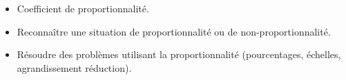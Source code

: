 \begin{prerequis}    
    \begin{itemize}        
        \item[\emoji{red-heart}] Coefficient de proportionnalité.
        \item[\emoji{diamond-suit}] Reconnaître une situation de proportionnalité ou de non-proportionnalité.
        \item[\emoji{diamond-suit}] Résoudre des problèmes utilisant la proportionnalité (pourcentages, échelles, agrandissement réduction).
    \end{itemize}
\end{prerequis}